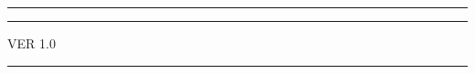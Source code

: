 \makeatletter
{}



\newcommand{\DocsReleaseVersion}{VER 1.0}

\renewcommand{\headrulewidth}{0pt}

{\color{myred}\rule{30pt}{2.1cm}}
    \hspace{0.2cm}
    \begin{minipage}[b]{18cm}
    {\fontsize{28pt}{18pt}\textbf{\color{mygrayy}\@title}}
    \end{minipage}

\vspace{48em}


\begin{flushright}
 \setlength\parindent{8em}
    \begin{minipage}[b]{2cm}
    \sphinxlogo
    \end{minipage}
    \hspace{0.2cm}
    \rule{3pt}{1.9cm}
    \hspace{0.2cm}
    \begin{minipage}[b]{7cm}
        {\large{\DocsReleaseVersion}}\smallskip\newline
         {\large{\@author}}\smallskip\newline
          {\large{\@date}}\smallskip
    \end{minipage}
    {\color{myred}\rule{30pt}{1.9cm}}
\end{flushright}


\restoregeometry
\makeatother
